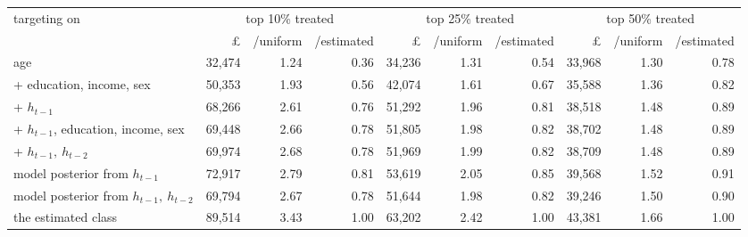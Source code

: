 \begin{tabular}{lrrrrrrrrr}
\toprule
targeting on & \multicolumn{3}{c}{top 10\% treated} & \multicolumn{3}{c}{top 25\% treated} & \multicolumn{3}{c}{top 50\% treated} \\
\cmidrule(lr){2-4} \cmidrule(lr){5-7} \cmidrule(lr){8-10}
 & \pounds & /uniform & /estimated & \pounds & /uniform & /estimated & \pounds & /uniform & /estimated \\
\midrule
age & 32,474 & 1.24 & 0.36 & 34,236 & 1.31 & 0.54 & 33,968 & 1.30 & 0.78 \\
+ education, income, sex & 50,353 & 1.93 & 0.56 & 42,074 & 1.61 & 0.67 & 35,588 & 1.36 & 0.82 \\
+ $h_{t-1}$ & 68,266 & 2.61 & 0.76 & 51,292 & 1.96 & 0.81 & 38,518 & 1.48 & 0.89 \\
+ $h_{t-1}$, education, income, sex & 69,448 & 2.66 & 0.78 & 51,805 & 1.98 & 0.82 & 38,702 & 1.48 & 0.89 \\
+ $h_{t-1},\ h_{t-2}$ & 69,974 & 2.68 & 0.78 & 51,969 & 1.99 & 0.82 & 38,709 & 1.48 & 0.89 \\
model posterior from $h_{t-1}$ & 72,917 & 2.79 & 0.81 & 53,619 & 2.05 & 0.85 & 39,568 & 1.52 & 0.91 \\
model posterior from $h_{t-1},\ h_{t-2}$ & 69,794 & 2.67 & 0.78 & 51,644 & 1.98 & 0.82 & 39,246 & 1.50 & 0.90 \\
the estimated class & 89,514 & 3.43 & 1.00 & 63,202 & 2.42 & 1.00 & 43,381 & 1.66 & 1.00 \\
\bottomrule
\end{tabular}
